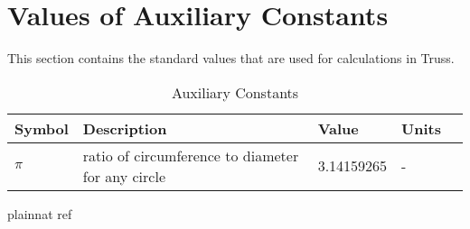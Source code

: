 \documentclass[12pt]{article}
\begin{document}
\section{Values of Auxiliary Constants}
This section contains the standard values that are used for calculations in 
Truss.

\begin{table}[!h]
	\renewcommand{\arraystretch}{1.2}
	\noindent \begin{longtable*}{l l l l c} 
		\toprule
		\textbf{Symbol} & \textbf{Description} & \textbf{Value} & 
		\textbf{Units} \\
		\midrule 
		$\pi$ & ratio of circumference to diameter for any circle & 3.14159265 
		& - \\
		\bottomrule		
	\end{longtable*}
	\caption{Auxiliary Constants} \label{TblAuxConst}
\end{table}
\newpage


 {plainnat}
 {ref}
\end{document}

